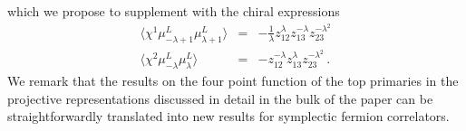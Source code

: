 \documentclass[12pt]{article}
\numberwithin{equation}{section}
\numberwithin{equation}{section}
\numberwithin{table}{section}\setlength{\multlinegap}{25pt}
\begin{document}
which we propose to supplement with the chiral expressions
\begin{eqnarray}
\langle \chi^1 \mu^L_{-\lambda+1} \mu^L_{\lambda+1} \rangle
&=& - \frac{1}{\lambda}  z_{12}^{\lambda} z_{13}^{-\lambda} z_{23}^{-\lambda^2}
\nonumber \\
\langle \chi^2 \mu^L_{-\lambda} \mu_\lambda^L \rangle
&=& -  z_{12}^{-\lambda} z_{13}^{\lambda} z_{23}^{-\lambda^2} \, .
\end{eqnarray}
We remark that the results on the four point function of the top primaries in the projective representations discussed in detail in the bulk
of the paper can 
be straightforwardly translated into new results for symplectic fermion correlators.
\end{document}
